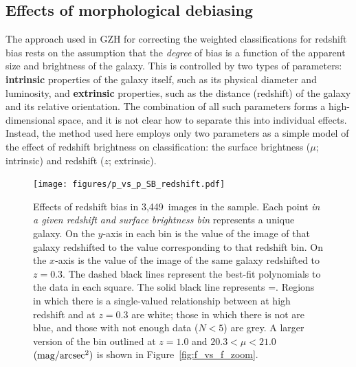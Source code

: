 \documentclass[a4paper,fleqn,usenatbib]{mnras}
\begin{document}
\subsection{Effects of morphological debiasing}\label{ssec:zeta_results}
The approach used in GZH for correcting the weighted classifications for
redshift bias rests on the assumption that the \emph{degree} of bias is a
function of the apparent size and brightness of the galaxy.
This is controlled by two types of parameters: \textbf{intrinsic} properties of
the galaxy itself, such as its physical diameter and luminosity, and
\textbf{extrinsic} properties, such as the distance (redshift) of the galaxy
and its relative orientation. The combination of all
such parameters forms a high-dimensional space, and it is not clear how to
separate this into individual effects. Instead, the method used here employs
only two parameters as a simple model of the effect of redshift brightness on classification: the
surface brightness ($\mu$; intrinsic) and redshift ($z$;
extrinsic).


\begin{figure}
\centering
\texttt{[image: figures/p\_vs\_p\_SB\_redshift.pdf]}
\caption{Effects of redshift bias in 3,449~images in the \ferengi{} sample.
Each point \emph{in a given redshift and surface brightness bin} represents a
unique galaxy. On the $y$-axis in each bin is the \ffeatures{} value of the
image of that galaxy redshifted to the value corresponding to that redshift
bin. On the $x$-axis is the \ffeatures{} value of the image of the same galaxy
redshifted to $z=0.3$. The dashed black lines represent the best-fit
polynomials to the data in each square. The solid black line represents
\ffeaturesz=\ffeaturesrest. Regions in which there is a single-valued
relationship between \ffeatures{} at high redshift and at $z=0.3$ are white;
those in which there is not are blue, and those with not enough data ($N<5$)
are grey. A larger version of the bin outlined at $z=1.0$ and $20.3 < \mu <
21.0$ $\rm (mag/arcsec^2)$ is shown in Figure~\ref{fig:f_vs_f_zoom}.}
\label{fig:f_vs_f}
\end{figure} 
\end{document}
